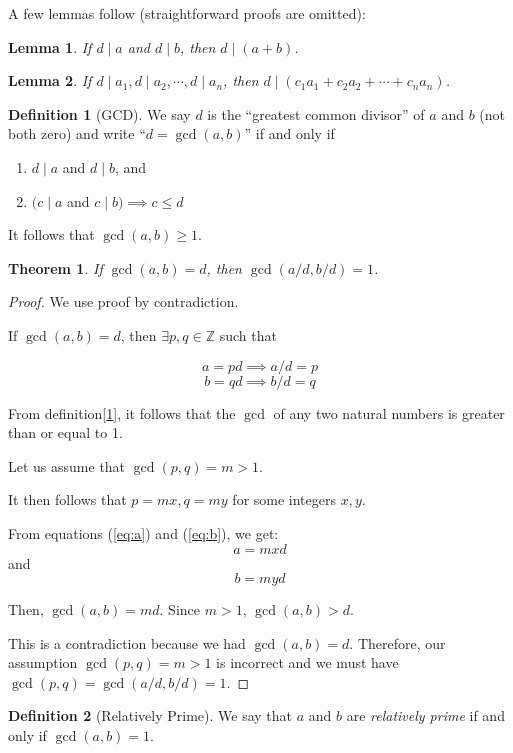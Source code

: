 \documentclass[english,notitlepage,smartquotes]{hgbreport}
\theoremstyle{definition}
\newtheorem{definition}{Definition}
\theoremstyle{remark}
\theoremstyle{plain}
\newtheorem{theorem}{Theorem}[chapter]
\newtheorem{lemma}{Lemma}[chapter]
\begin{document}
A few lemmas follow (straightforward proofs are omitted):
\begin{lemma}
\label{lemma:divides-sum}
If $d\mid a$ and $d\mid b$, then $d\mid(a+b)$.
\end{lemma}
\begin{lemma}
\label{lemma:divides-lin-comb}
If $d\mid a_1,d\mid a_2,\cdots, d\mid a_n$, then $d\mid(c_1a_1+c_2a_2+\cdots+c_na_n)$.
\end{lemma}
\begin{definition}[GCD]
\label{def:gcd}
We say $d$ is the ``greatest common divisor'' of $a$ and $b$ (not both zero) and write ``$d=\gcd(a, b)$'' if and only if
\begin{enumerate}
\item $d\mid a$ and $d\mid b$, and
\item $(c\mid a$ and $c\mid b)\implies c\leq d$
\end{enumerate}
\end{definition}

It follows that $\gcd(a, b)\geq 1$.

\begin{theorem}
\label{thm:gcd-multiple}
If $\gcd(a,b)=d$, then $\gcd(a/d, b/d)=1$.
\end{theorem}

\begin{proof}
We use proof by contradiction.

If $\gcd(a,b)=d$, then $\exists p,q\in\mathbb{Z}$ such that

\begin{equation}
\label{eq:a}
a=pd\implies a/d=p
\end{equation}
\begin{equation}
\label{eq:b}
b=qd\implies b/d=q
\end{equation}

From definition[\ref{def:gcd}], it follows that the $\gcd$ of any two natural numbers is greater than or equal to 1. 

Let us assume that $\gcd(p, q)=m>1$.

It then follows that $p=mx,q=my$ for some integers $x, y$.

From equations (\ref{eq:a}) and (\ref{eq:b}), we get:
$$
a=mxd
$$
and
$$
b=myd
$$

Then, $\gcd(a, b)=md$. Since $m>1$, $\gcd(a, b) > d$.

This is a contradiction because we had $\gcd(a,b)=d$. Therefore, our assumption $\gcd(p,q)=m>1$ is incorrect and we must have $\gcd(p,q)=\gcd(a/d,b/d)=1$.
\end{proof}
\begin{definition}[Relatively Prime]
We say that $a$ and $b$ are \emph{relatively prime} if and only if $\gcd(a,b)=1$.
\end{definition}
\end{document}
